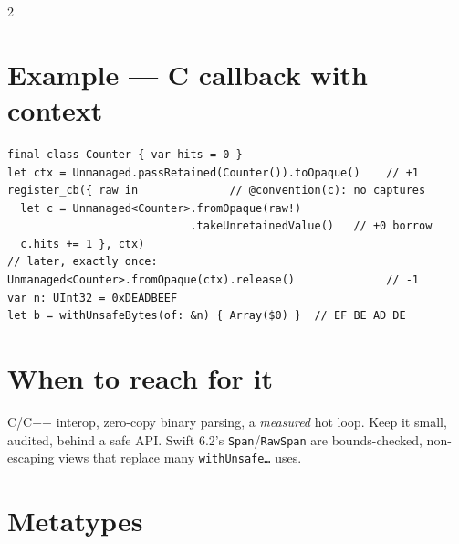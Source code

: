 \documentclass[8pt]{extarticle}
\begin{document}
\begin{multicols}{2}
\section{Example — C callback with context}
\begin{lstlisting}[language=SwiftSheet]
final class Counter { var hits = 0 }
let ctx = Unmanaged.passRetained(Counter()).toOpaque()    // +1
register_cb({ raw in              // @convention(c): no captures
  let c = Unmanaged<Counter>.fromOpaque(raw!)
                            .takeUnretainedValue()   // +0 borrow
  c.hits += 1 }, ctx)
// later, exactly once:
Unmanaged<Counter>.fromOpaque(ctx).release()              // -1
var n: UInt32 = 0xDEADBEEF
let b = withUnsafeBytes(of: &n) { Array($0) }  // EF BE AD DE
\end{lstlisting}

\section{When to reach for it}
C/C++ interop, zero-copy binary parsing, a \emph{measured} hot loop. Keep it
small, audited, behind a safe API. Swift 6.2's \texttt{Span}/\texttt{RawSpan}
are bounds-checked, non-escaping views that replace many
\texttt{withUnsafe…} uses.

\columnbreak

\section{Metatypes}


\end{multicols}
\end{document}
